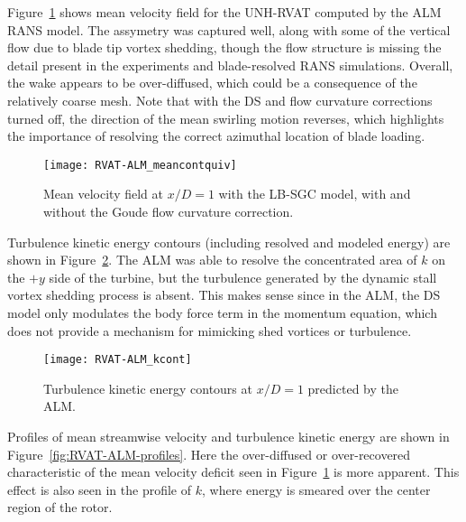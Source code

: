 Figure~\ref{fig:RVAT-ALM-meancontquiv} shows mean velocity field for the
UNH-RVAT computed by the ALM RANS model. The assymetry was captured well, along
with some of the vertical flow due to blade tip vortex shedding, though the flow
structure is missing the detail present in the experiments and blade-resolved
RANS simulations. Overall, the wake appears to be over-diffused, which could be
a consequence of the relatively coarse mesh. Note that with the DS and flow
curvature corrections turned off, the direction of the mean swirling motion
reverses, which highlights the importance of resolving the correct azimuthal
location of blade loading.

\begin{figure}
    \centering

    \texttt{[image: RVAT-ALM\_meancontquiv]}
    
    \caption{Mean velocity field at $x/D=1$ with the LB-SGC model, with and
        without the Goude flow curvature correction.}
    
    \label{fig:RVAT-ALM-meancontquiv}
\end{figure}

Turbulence kinetic energy contours (including resolved and modeled energy) are
shown in Figure~\ref{fig:RVAT-ALM-kcont}. The ALM was able to resolve the
concentrated area of $k$ on the $+y$ side of the turbine, but the turbulence
generated by the dynamic stall vortex shedding process is absent. This makes
sense since in the ALM, the DS model only modulates the body force term in the
momentum equation, which does not provide a mechanism for mimicking shed
vortices or turbulence.

\begin{figure}
    \centering

    \texttt{[image: RVAT-ALM\_kcont]}
    
    \caption{Turbulence kinetic energy contours at $x/D=1$ predicted by the
        ALM.}
    
    \label{fig:RVAT-ALM-kcont}
\end{figure}

Profiles of mean streamwise velocity and turbulence kinetic energy are shown in
Figure~\ref{fig:RVAT-ALM-profiles}. Here the over-diffused or over-recovered
characteristic of the mean velocity deficit seen in
Figure~\ref{fig:RVAT-ALM-meancontquiv} is more apparent. This effect is also
seen in the profile of $k$, where energy is smeared over the center region of
the rotor.

